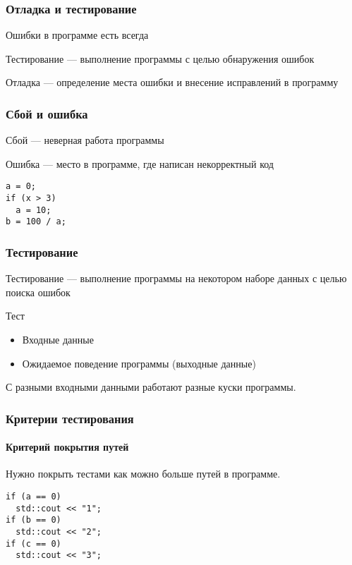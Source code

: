 \documentclass{beamer}
\begin{document}
  \begin{frame}
    \frametitle{Отладка и тестирование}
    \begin{block}{Ошибки в программе есть всегда}
    \end{block}
    \begin{block}{Тестирование --- выполнение программы с целью обнаружения ошибок}
    \end{block}
    \begin{block}{Отладка --- определение места ошибки и внесение исправлений в программу}
    \end{block}
  \end{frame}
  
  \begin{frame}[fragile]
    \frametitle{Сбой и ошибка}
    \begin{block}{Сбой --- неверная работа программы}
    \end{block}
    \begin{block}{Ошибка --- место в программе, где написан некорректный код}
    \end{block}
\begin{lstlisting}
a = 0;
if (x > 3)
  a = 10;
b = 100 / a;
\end{lstlisting}
\end{frame}

  \begin{frame}
    \frametitle{Тестирование}
    Тестирование --- выполнение программы на некотором наборе данных с целью поиска ошибок
    \begin{block}{Тест}
      \begin{itemize}
        \item Входные данные
        \item Ожидаемое поведение программы (выходные данные)
      \end{itemize}
    \end{block}
    С разными входными данными работают разные куски программы.
  \end{frame}

  \begin{frame}[fragile]
    \frametitle{Критерии тестирования}
    \framesubtitle{Критерий покрытия путей}
    Нужно покрыть тестами как можно больше путей в программе.
\begin{lstlisting}
if (a == 0)
  std::cout << "1";
if (b == 0)
  std::cout << "2";
if (c == 0)
  std::cout << "3";
\end{lstlisting}
\end{frame}
\end{document}
